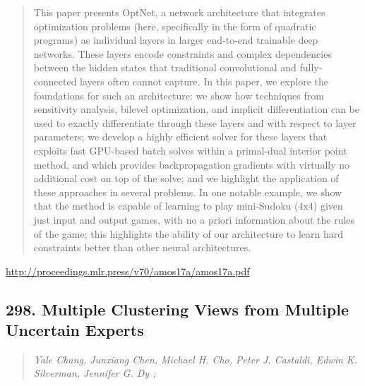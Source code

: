\documentclass{article}
\begin{document}
\begin{quote}
    This paper presents OptNet, a network architecture that integrates optimization problems (here, specifically in the form of quadratic programs) as individual layers in larger end-to-end trainable deep networks. These layers encode constraints and complex dependencies between the hidden states that traditional convolutional and fully-connected layers often cannot capture. In this paper, we explore the foundations for such an architecture: we show how techniques from sensitivity analysis, bilevel optimization, and implicit differentiation can be used to exactly differentiate through these layers and with respect to layer parameters; we develop a highly efficient solver for these layers that exploits fast GPU-based batch solves within a primal-dual interior point method, and which provides backpropagation gradients with virtually no additional cost on top of the solve; and we highlight the application of these approaches in several problems. In one notable example, we show that the method is capable of learning to play mini-Sudoku (4x4) given just input and output games, with no a priori information about the rules of the game; this highlights the ability of our architecture to learn hard constraints better than other neural architectures.  \end{quote}

\href{http://proceedings.mlr.press/v70/amos17a/amos17a.pdf}{http://proceedings.mlr.press/v70/amos17a/amos17a.pdf}

\subsection{298. Multiple Clustering Views from Multiple Uncertain Experts}

\begin{quote}
\footnotesize{\textit{Yale Chang, Junxiang Chen, Michael H. Cho, Peter J. Castaldi, Edwin K. Silverman, Jennifer G. Dy ;}}
\end{quote}
\end{document}
